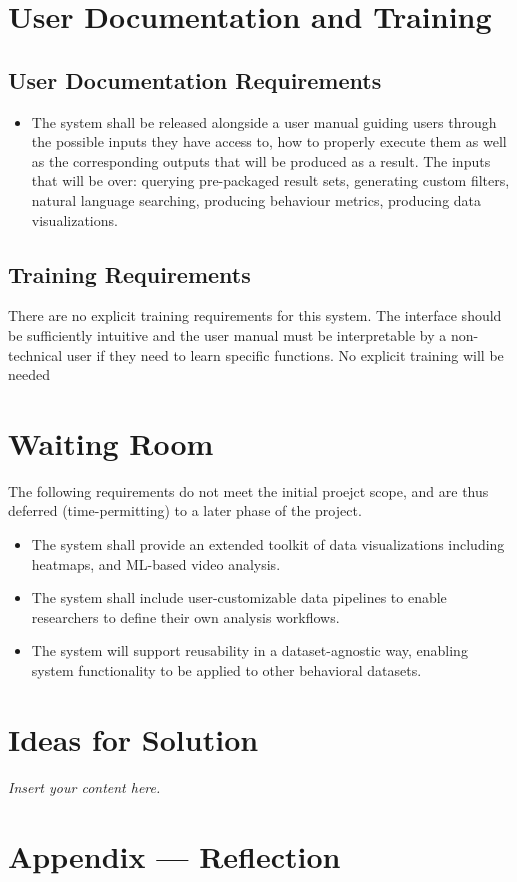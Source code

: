 \documentclass[12pt]{article}
\newcommand{\lips}{\textit{Insert your content here.}}
\begin{document}
\section{User Documentation and Training}
\subsection{User Documentation Requirements}

\begin{itemize}
    \item The system shall be released alongside a user manual guiding users through the possible inputs they have access to, how to properly execute them as well as the corresponding outputs that will be produced as a result. The inputs that 
    will be over: querying pre-packaged result sets, generating custom filters, natural language searching, producing behaviour metrics, producing data visualizations.
\end{itemize}

\subsection{Training Requirements}

\par{ There are no explicit training requirements for this system. The interface should be sufficiently intuitive and the user manual must be interpretable by a non-technical user if they need to learn specific functions.
No explicit training will be needed }

\section{Waiting Room}

\par{The following requirements do not meet the initial proejct scope, and are thus deferred (time-permitting) to a later phase of the project. }

\begin{itemize}
    \item The system shall provide an extended toolkit of data visualizations including heatmaps, and ML-based video analysis.
    \item The system shall include user-customizable data pipelines to enable researchers to define their own analysis workflows.
    \item The system will support reusability in a dataset-agnostic way, enabling system functionality to be applied to other behavioral datasets.
\end{itemize}


\section{Ideas for Solution}
\lips

\newpage{}
\section*{Appendix --- Reflection}




\end{document}
